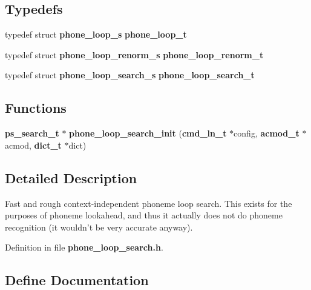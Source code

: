 \subsection*{\-Typedefs}
\begin{DoxyCompactItemize}
\item 
typedef struct {\bf phone\-\_\-loop\-\_\-s} {\bfseries phone\-\_\-loop\-\_\-t}\label{phone__loop__search_8h_a377517ed7dc87ca9ad683dad2182c036}

\item 
typedef struct {\bf phone\-\_\-loop\-\_\-renorm\-\_\-s} {\bfseries phone\-\_\-loop\-\_\-renorm\-\_\-t}\label{phone__loop__search_8h_a313734607dd312343fd138ccc32b9228}

\item 
typedef struct {\bf phone\-\_\-loop\-\_\-search\-\_\-s} {\bfseries phone\-\_\-loop\-\_\-search\-\_\-t}\label{phone__loop__search_8h_aff0f48051fd9e2725230896875887aa2}

\end{DoxyCompactItemize}
\subsection*{\-Functions}
\begin{DoxyCompactItemize}
\item 
{\bf ps\-\_\-search\-\_\-t} $\ast$ {\bfseries phone\-\_\-loop\-\_\-search\-\_\-init} ({\bf cmd\-\_\-ln\-\_\-t} $\ast$config, {\bf acmod\-\_\-t} $\ast$acmod, {\bf dict\-\_\-t} $\ast$dict)\label{phone__loop__search_8h_a2308707c1a22ea9b0495f6c7f151f806}

\end{DoxyCompactItemize}


\subsection{\-Detailed \-Description}
\-Fast and rough context-\/independent phoneme loop search. \-This exists for the purposes of phoneme lookahead, and thus it actually does not do phoneme recognition (it wouldn't be very accurate anyway). 

\-Definition in file {\bf phone\-\_\-loop\-\_\-search.\-h}.



\subsection{\-Define \-Documentation}
